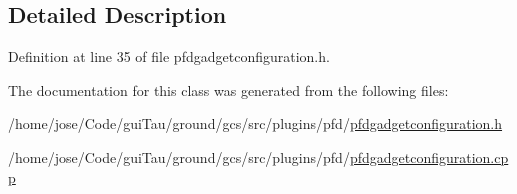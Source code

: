 \subsection{Detailed Description}


Definition at line 35 of file pfdgadgetconfiguration.\-h.



The documentation for this class was generated from the following files\-:\begin{DoxyCompactItemize}
\item 
/home/jose/\-Code/gui\-Tau/ground/gcs/src/plugins/pfd/\hyperlink{pfdgadgetconfiguration_8h}{pfdgadgetconfiguration.\-h}\item 
/home/jose/\-Code/gui\-Tau/ground/gcs/src/plugins/pfd/\hyperlink{pfdgadgetconfiguration_8cpp}{pfdgadgetconfiguration.\-cpp}\end{DoxyCompactItemize}
